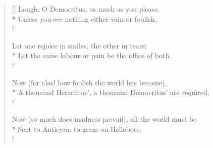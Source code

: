 {\begin{verse}[\versewidth]
Laugh, O Democritus, as much as you please,\\*
Unless you see nothing either vain or foolish.\\!

Let one rejoice in smiles, the other in tears;\\*
Let the same labour or pain be the office of both.\\!

Now (for alas! how foolish the world has become),\\*
A thousand Heraclitus', a thousand Democritus' are required.\\!

Now (so much does madness prevail), all the world must be\\*
Sent to Anticyra, to graze on Hellebore.\\!
\end{verse}
}
